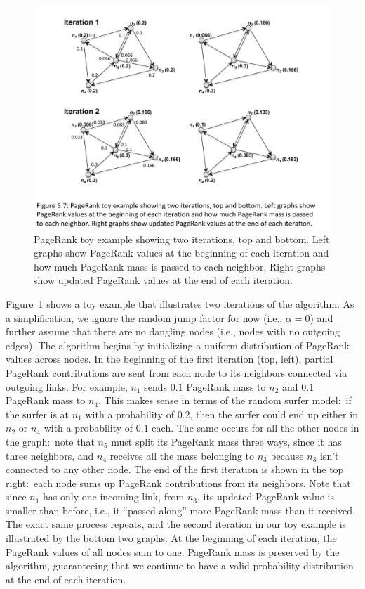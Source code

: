 \begin{figure}[t]
\begin{center}
\includegraphics[scale=0.6]{figures/fig-ch5-PageRank-toy-example.pdf}
\end{center}
\caption{PageRank toy example showing two iterations, top and bottom.
  Left graphs show PageRank values at the beginning of each iteration
  and how much PageRank mass is passed to each neighbor.  Right graphs
  show updated PageRank values at the end of each iteration.}
\label{figure:chapter-graphs:PageRank-toy}
\end{figure}

Figure~\ref{figure:chapter-graphs:PageRank-toy} shows a toy example that
illustrates two iterations of the algorithm.  As a simplification, we
ignore the random jump factor for now (i.e., $\alpha=0$) and further
assume that there are no dangling nodes (i.e., nodes with no outgoing
edges).  The algorithm begins by initializing a uniform distribution
of PageRank values across nodes.  In the beginning of the first
iteration (top, left), partial PageRank contributions are sent from
each node to its neighbors connected via outgoing links.  For example,
$n_1$ sends $0.1$ PageRank mass to $n_2$ and $0.1$ PageRank mass to
$n_4$.  This makes sense in terms of the random surfer model:\ if the
surfer is at $n_1$ with a probability of $0.2$, then the surfer could end up
either in $n_2$ or $n_4$ with a probability of $0.1$ each.  The same
occurs for all the other nodes in the graph:\ note that $n_5$ must
split its PageRank mass three ways, since it has three neighbors, and
$n_4$ receives all the mass belonging to $n_3$ because $n_3$ isn't
connected to any other node.  The end of the first iteration is shown
in the top right:\ each node sums up PageRank contributions from its
neighbors.  Note that since $n_1$ has only one incoming link, from
$n_3$, its updated PageRank value is smaller than before, i.e., it
``passed along'' more PageRank mass than it received.  The exact same
process repeats, and the second iteration in our toy example is
illustrated by the bottom two graphs.  At the beginning of each
iteration, the PageRank values of all nodes sum to one.  PageRank mass
is preserved by the algorithm, guaranteeing that we continue to have a
valid probability distribution at the end of each iteration.

